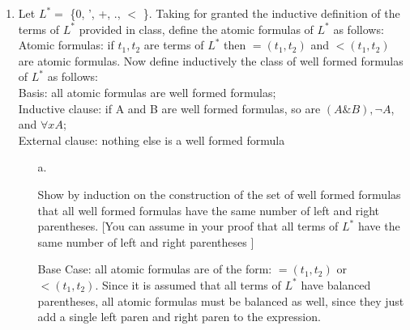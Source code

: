 
\usepackage{amsmath, dsfont, mathtools, verbatim, tikz, float, textcomp}

\usetikzlibrary{arrows,automata}

\oddsidemargin 0in
\evensidemargin 0in
\textwidth 6.5in
\topmargin -0.5in
\textheight 9.0in
\newcommand{\norm}[1]{\left\lVert #1 \right\rVert}
\newcommand{\?}{\stackrel{?}{=}}
\DeclarePairedDelimiter{\ceil}{\lceil}{\rceil}



\pagestyle{myheadings}

\begin{enumerate}
  \item
    \begin{question}
      Let $L^* = $ \{0, ', +, ., $<$ \}. Taking for granted the inductive definition of the terms of $L^*$ provided in class, define the atomic formulas of $L^*$ as follows:\\
      Atomic formulas: if $t_1, t_2$ are terms of $L^*$ then $=(t_1,t_2)$ and $<(t_1,t_2)$ are atomic formulas. Now define inductively the class of well formed formulas of $L^*$ as follows:\\
      Basis: all atomic formulas are well formed formulas;\\
      Inductive clause: if A and B are well formed formulas, so are $(A\&B), \neg A$, and $\forall xA$;\\
      External clause: nothing else is a well formed formula
    \end{question}

    \begin{enumerate}
      \item [a.]
        \begin{question}
          Show by induction on the construction of the set of well formed formulas that all well formed formulas have the same number of left and right parentheses. [You can assume in your proof that all terms of $L^*$ have the same number of left and right parentheses ]\\
        \end{question}

        Base Case: all atomic formulas are of the form: $=(t_1,t_2)$ or $<(t_1,t_2)$. Since it is assumed that all terms of $L^*$ have balanced parentheses, all atomic formulas must be balanced as well, since they just add a single left paren and right paren to the expression.\\


\end{enumerate}
\end{enumerate}
